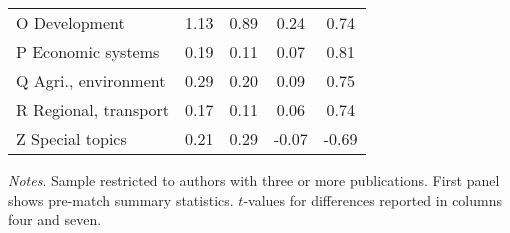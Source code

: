 \begin{table}[H]
\begin{threeparttable}
\begin{tabular}{p{3.55cm}S@{}S@{}S@{}S@{}}
            \quad O Development &        1.13&        0.89&        0.24&        0.74\\
            \quad P Economic systems&        0.19&        0.11&        0.07&        0.81\\
            \quad Q Agri., environment&        0.29&        0.20&        0.09&        0.75\\
            \quad R Regional, transport&        0.17&        0.11&        0.06&        0.74\\
            \quad Z Special topics&        0.21&        0.29&       -0.07&       -0.69\\
            \bottomrule
        \end{tabular}
        \begin{tablenotes}
            \tiny
            \item \textit{Notes}. Sample restricted to authors with three or more publications. First panel shows pre-match summary statistics. \(t\)-values for differences reported in columns four and seven.
        \end{tablenotes}
    \end{threeparttable}
\end{table}